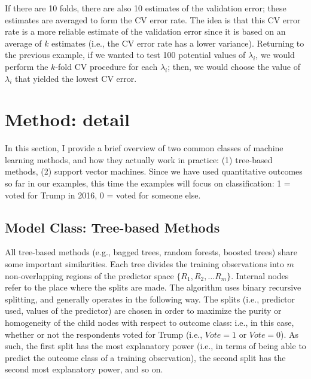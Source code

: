 \documentclass{book}
\begin{document}
If there are 10 folds, there are also 10 estimates of the validation error;
these estimates are averaged to form the CV error rate. The idea is that this
CV error rate is a more reliable estimate of the validation error since it is
based on an average of \(k\) estimates (i.e., the CV error rate has a lower
variance). Returning to the previous example, if we wanted to test 100
potential values of \(\lambda _{i}\), we would perform the \(k\)-fold CV
procedure for each \(\lambda _{i}\); then, we would choose the value of
\(\lambda _{i}\) that yielded the lowest CV error.

\hypertarget{method-detail-1}{%
\section{Method: detail}\label{method-detail-1}}

In this section, I provide a brief overview of two common classes of machine
learning methods, and how they actually work in practice: (1) tree-based
methods, (2) support vector machines. Since we have used quantitative outcomes
so far in our examples, this time the examples will focus on classification: 1
= voted for Trump in 2016, 0 = voted for someone else.

\hypertarget{model-class-tree-based-methods}{%
\subsection{Model Class: Tree-based
Methods}\label{model-class-tree-based-methods}}

All tree-based methods (e.g., bagged trees, random forests, boosted trees)
share some important similarities. Each tree divides the training observations
into \(m\) non-overlapping regions of the predictor space
\(\{ R_{1},R_{2}, \ldots R_{m} \}\). Internal nodes refer to the place where
the splits are made. The algorithm uses binary recursive splitting, and
generally operates in the following way. The splits (i.e., predictor used,
values of the predictor) are chosen in order to maximize the purity or
homogeneity of the child nodes with respect to outcome class: i.e., in this
case, whether or not the respondents voted for Trump (i.e., \(Vote=1\) or
\(Vote=0\)). As such, the first split has the most explanatory power (i.e., in
terms of being able to predict the outcome class of a training observation),
the second split has the second most explanatory power, and so on.
\end{document}
